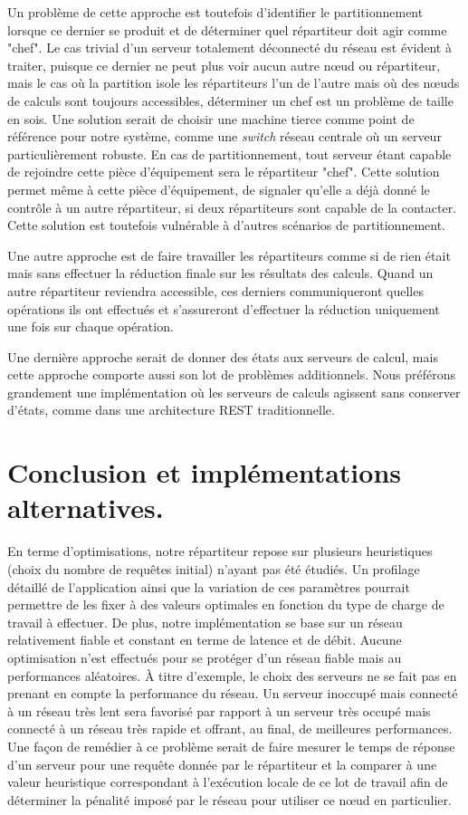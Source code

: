 Un problème de cette approche est toutefois d'identifier le partitionnement lorsque ce dernier se produit et de déterminer quel répartiteur doit agir comme "chef". Le cas trivial d'un 
serveur totalement déconnecté du réseau est évident à traiter, puisque ce dernier ne peut plus voir aucun autre nœud ou répartiteur, mais le cas où la partition isole les répartiteurs 
l'un de l'autre mais où des nœuds de calculs sont toujours accessibles, déterminer un chef est un problème de taille en sois. Une solution serait de choisir une machine tierce comme point de 
référence pour notre système, comme une \emph{switch} réseau centrale où un serveur particulièrement robuste. En cas de partitionnement, tout serveur étant capable de rejoindre cette pièce d'équipement 
sera le répartiteur "chef". Cette solution permet même à cette pièce d'équipement, de signaler qu'elle a déjà donné le contrôle à un autre répartiteur, si deux répartiteurs sont capable de la contacter. 
Cette solution est toutefois vulnérable à d'autres scénarios de partitionnement. 

Une autre approche est de faire travailler les répartiteurs comme si de rien était mais sans effectuer la réduction finale sur les résultats des calculs. Quand un autre répartiteur reviendra accessible, 
ces derniers communiqueront quelles opérations ils ont effectués et s'assureront d'effectuer la réduction uniquement une fois sur chaque opération. 

Une dernière approche serait de donner des états aux serveurs de calcul, mais cette approche comporte aussi son lot de problèmes additionnels. 
Nous préférons grandement une implémentation où les serveurs de calculs agissent sans conserver d'états, comme dans une architecture REST traditionnelle. 

\section{Conclusion et implémentations alternatives.}

En terme d'optimisations, notre répartiteur repose sur plusieurs heuristiques (choix du nombre de requêtes initial) n'ayant pas été étudiés. 
Un profilage détaillé de l'application ainsi que la variation de ces paramètres pourrait permettre de les fixer à des valeurs optimales en fonction
du type de charge de travail à effectuer. De plus, notre implémentation se base sur un réseau relativement fiable et constant en terme de latence et de débit. 
Aucune optimisation n'est effectués pour se protéger d'un réseau fiable mais au performances aléatoires. À titre d'exemple, le choix des serveurs ne se fait pas 
en prenant en compte la performance du réseau. Un serveur inoccupé mais connecté à un réseau très lent sera favorisé par rapport à un serveur très occupé mais connecté
à un réseau très rapide et offrant, au final, de meilleures performances. Une façon de remédier à ce problème serait de faire mesurer le temps de réponse d'un serveur
pour une requête donnée par le répartiteur et la comparer à une valeur heuristique correspondant à l'exécution locale de ce lot de travail afin de déterminer la
pénalité imposé par le réseau pour utiliser ce nœud en particulier. 

